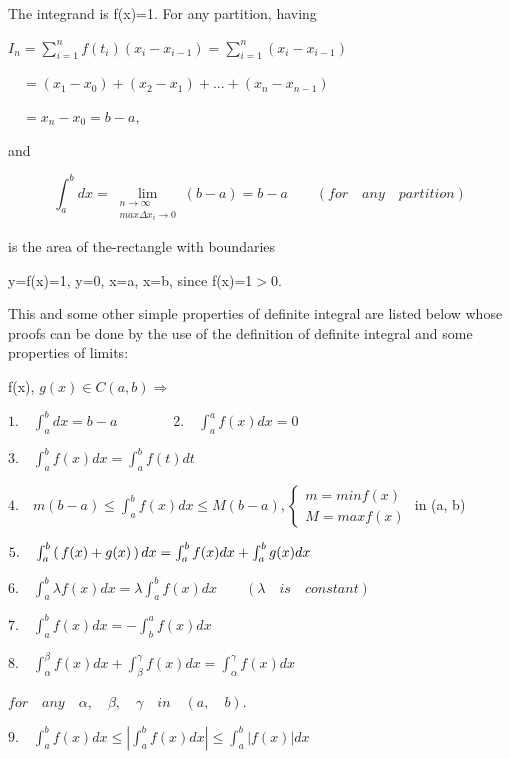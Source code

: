 \documentclass[11pt]{amsbook}
\begin{document}
\begin{hSolution}
	The integrand is f(x)=1. For any partition, having
    
    $I_{n}=\sum_{i=1}^{n}f(t_{i})(x_{i}-x_{i-1})=\sum_{i=1}^{n}(x_{i}-x_{i-1})$
    
    $\quad=(x_{1}-x_{0})+(x_{2}-x_{1})+...+(x_{n}-x_{n-1})$
    
    $\quad=x_{n}-x_{0}=b-a,$
    
    and
    
    $$\int_{a}^{b}dx=\lim_{\substack{n\to\infty\\max\Delta x_{i}\to 0}}(b-a)=b-a \qquad (for\quad any\quad partition)$$
    
    is the area of the-rectangle with boundaries   
    
    \qquad \qquad y=f(x)=1, y=0, x=a, x=b, since f(x)=1$>$0.
    
    \qquad This and some other simple properties of definite integral are listed below whose proofs can be done by the use of the definition of definite integral and some properties of limits:
	\end{hSolution}
    \begin{hProperty}
    f(x), $g(x) \in C(a, b) \Longrightarrow$
    
    $1.\quad \int_{a}^{b}dx=b-a\qquad \qquad 2.\quad \int_{a}^{a}f(x)dx=0$
    
    $3.\quad \int_{a}^{b}f(x)dx=\int_{a}^{b}f(t)dt$
    
    $4.\quad m(b-a)\leq \int_{a}^{b}f(x)dx\leq M(b-a), 
    \begin{cases}
    m=minf(x) \\ M=maxf(x)
    \end{cases}$
    in (a, b)
    
    $5.\quad \int_{a}^{b} \left( \, f(x)+g(x) \, \right) dx=\int_{a}^{b}f(x)dx+\int_{a}^{b}g(x)dx$
    
    $6.\quad \int_{a}^{b}\lambda f(x)dx=\lambda \int_{a}^{b}f(x)dx\qquad (\lambda \quad is \quad constant)$
    
    $7. \quad\int_{a}^{b}f(x)dx=-\int_{b}^{a}f(x)dx$
    
    $8.\quad \int_{\alpha}^{\beta}f(x)dx+\int_{\beta}^{\gamma}f(x)dx=\int_{\alpha}^{\gamma}f(x)dx$
    
    $for \quad any \quad \alpha,\quad \beta,\quad \gamma \quad in\quad (a,\quad b).$
    
    $9.\quad \int_{a}^{b}f(x)dx\leq \left|\int_{a}^{b}f(x)dx\right|\leq \int_{a}^{b}\left|f(x)\right|dx$
    \end{hProperty}
\end{document}
